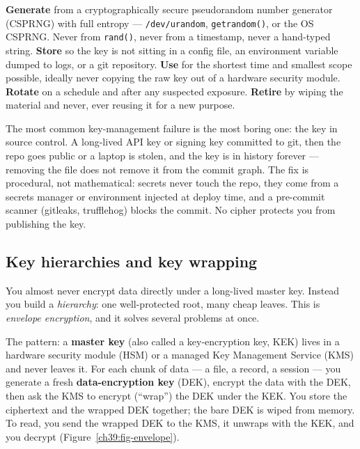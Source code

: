 \textbf{Generate} from a cryptographically secure pseudorandom number generator (CSPRNG) with full entropy ---
\texttt{/dev/urandom}, \texttt{getrandom()}, or the OS CSPRNG. Never from
\texttt{rand()}, never from a timestamp, never a hand-typed string. \textbf{Store}
so the key is not sitting in a config file, an environment variable dumped to logs,
or a git repository. \textbf{Use} for the shortest time and smallest scope
possible, ideally never copying the raw key out of a hardware security module.
\textbf{Rotate} on a schedule and after any suspected exposure. \textbf{Retire} by
wiping the material and never, ever reusing it for a new purpose.

\begin{trapbox}
The most common key-management failure is the most boring one: the key in source
control. A long-lived API key or signing key committed to git, then the repo goes
public or a laptop is stolen, and the key is in history forever --- removing the
file does not remove it from the commit graph. The fix is procedural, not
mathematical: secrets never touch the repo, they come from a secrets manager or
environment injected at deploy time, and a pre-commit scanner (gitleaks,
trufflehog) blocks the commit. No cipher protects you from publishing the key.
\end{trapbox}

\subsection{Key hierarchies and key wrapping}

You almost never encrypt data directly under a long-lived master key. Instead you
build a \emph{hierarchy}: one well-protected root, many cheap leaves. This is
\emph{envelope encryption}, and it solves several problems at once.

The pattern: a \textbf{master key} (also called a key-encryption key, KEK) lives in
a hardware security module (HSM) or a managed Key Management Service (KMS) and never leaves it. For each chunk of data --- a file, a
record, a session --- you generate a fresh \textbf{data-encryption key} (DEK),
encrypt the data with the DEK, then ask the KMS to encrypt (``wrap'') the DEK under
the KEK. You store the ciphertext and the wrapped DEK together; the bare DEK is
wiped from memory. To read, you send the wrapped DEK to the KMS, it unwraps with
the KEK, and you decrypt (Figure~\ref{ch39:fig-envelope}).

